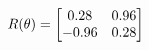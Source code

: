 \documentclass[preview]{standalone}
\begin{document}
\begin{align*}
\special{dvisvgm:raw <g id='unique000'>}R(\theta) = \begin{bmatrix}0.28 & 0.96\\-0.96 & 0.28\end{bmatrix}\special{dvisvgm:raw </g>}
\end{align*}
\end{document}
